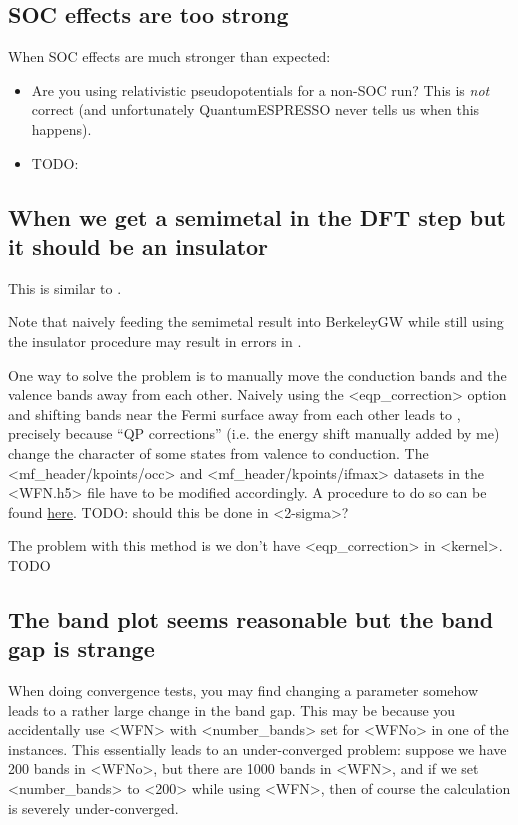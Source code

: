 \documentclass[hyperref, a4paper, 12pt]{report}
\def\texttt#1{<#1>}%
\newcommand{\shortcode}[1]{\texttt{#1}}
\begin{document}
\subsection{SOC effects are too strong}

When SOC effects are much stronger than expected: 
\begin{itemize}
    \item Are you using relativistic pseudopotentials for a non-SOC run?
        This is \emph{not} correct 
        (and unfortunately QuantumESPRESSO never tells us when this happens).
    \item TODO: 
\end{itemize}

\subsection{When we get a semimetal in the DFT step but it should be an insulator}\label{sec:unexpected-metal}

This is similar to .

Note that naively feeding the semimetal result into BerkeleyGW 
while still using the insulator procedure
may result in errors in . 

One way to solve the problem is 
to manually move the conduction bands and the valence bands away from each other.
Naively using the \shortcode{eqp_correction} option 
and shifting bands near the Fermi surface away from each other 
leads to ,
precisely because 
``QP corrections'' (i.e. the energy shift manually added by me) 
change the character of some states from valence to conduction.
The \shortcode{mf_header/kpoints/occ} and \shortcode{mf_header/kpoints/ifmax} datasets 
in the \shortcode{WFN.h5} file 
have to be modified accordingly.
A procedure to do so can be found \href{./scripts/wfn-editing/move-occupation.jl}{here}.
TODO: should this be done in \shortcode{2-sigma}?

The problem with this method is we don't have \shortcode{eqp_correction} in \shortcode{kernel}. TODO 

\subsection{The band plot seems reasonable but the band gap is strange}

When doing convergence tests, 
you may find changing a parameter 
somehow leads to a rather large change in the band gap. 
This may be because you accidentally use \shortcode{WFN} 
with \shortcode{number_bands} set for \shortcode{WFNo} 
in one of the instances. 
This essentially leads to an under-converged problem: 
suppose we have 200 bands in \shortcode{WFNo},
but there are 1000 bands in \shortcode{WFN}, 
and if we set \shortcode{number_bands} to \shortcode{200} 
while using \shortcode{WFN}, 
then of course the calculation is severely under-converged.
\end{document}
